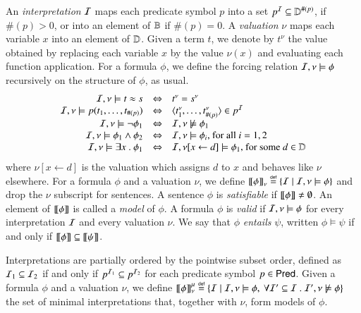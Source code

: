 An \emph{interpretation} $\mathcal{I}$ maps each predicate symbol $p$ into a
set $p^{\mathcal{I}} \subseteq \mathbb{D}^{\#(p)}$, if $\#(p)>0$, or into an element
of $\mathbb{B}$ if $\#(p)=0$. A \emph{valuation} $\nu$ maps each variable
$x$ into an element of $\mathbb{D}$. Given a term $t$, we denote by $t^\nu$
the value obtained by replacing each variable $x$ by the value
$\nu(x)$ and evaluating each function application. For a formula
$\phi$, we define the forcing relation $\mathcal{I},\nu \models \phi$
recursively on the structure of $\phi$, as usual.  
\ifLongVersion
\[
\begin{array}{rcl}
\mathcal{I},\nu \models t \approx s & \Leftrightarrow & t^\nu=s^\nu \\
\mathcal{I},\nu \models p(t_1,\ldots,t_{\#(p)}) & \Leftrightarrow & \langle t_1^\nu,\ldots,t_{\#(p)}^\nu \rangle \in p^{\mathcal{I}} \\
\mathcal{I},\nu \models \neg\phi_1 & \Leftrightarrow & \mathcal{I},\nu \not\models \phi_1 \\
\mathcal{I},\nu \models \phi_1 \wedge \phi_2 & \Leftrightarrow & \mathcal{I},\nu \models \phi_i \text{, for all } i=1,2 \\ 
\mathcal{I},\nu \models \exists x ~.~ \phi_1 & \Leftrightarrow & \mathcal{I},\nu[x\leftarrow d] \models \phi_1 \text{, for some } d \in \mathbb{D} 
\end{array}
\]
where $\nu[x\leftarrow d]$ is the valuation which assigns $d$ to $x$
and behaves like $\nu$ elsewhere.  
\fi 
For a formula $\phi$ and a valuation $\nu$, we define ${\bf [\![} \phi {\bf ]\!]}_\nu
\stackrel{\scriptscriptstyle{\mathsf{def}}}{=} \{ \mathcal{I} \mid \mathcal{I},\nu \models \phi \}$ and drop the $\nu$ subscript
for sentences. A sentence $\phi$ is \emph{satisfiable} if
${\bf [\![} \phi {\bf ]\!]}\neq\emptyset$. An element of ${\bf [\![} \phi {\bf ]\!]}$ is called a
\emph{model} of $\phi$. A formula $\phi$ is \emph{valid} if $\mathcal{I},\nu
\models \phi$ for every interpretation $\mathcal{I}$ and every valuation
$\nu$. We say that $\phi$ \emph{entails} $\psi$, written $\phi \models
\psi$ if and only if ${\bf [\![} \phi {\bf ]\!]} \subseteq {\bf [\![} \psi {\bf ]\!]}$.

Interpretations are partially ordered by the pointwise subset order,
defined as $\mathcal{I}_1 \subseteq \mathcal{I}_2$ if and only if $p^{\mathcal{I}_1} \subseteq
p^{\mathcal{I}_2}$ for each predicate symbol $p \in \mathsf{Pred}$. Given a formula
$\phi$ and a valuation $\nu$, we define ${\bf [\![} \phi {\bf ]\!]}^\mu_\nu \stackrel{\scriptscriptstyle{\mathsf{def}}}{=}
\{ \mathcal{I} \mid \mathcal{I},\nu \models \phi,~ \forall \mathcal{I}' \subseteq \mathcal{I} ~.~
  \mathcal{I}',\nu \not\models \phi \}$ the set of minimal interpretations that,
together with $\nu$, form models of $\phi$. 

